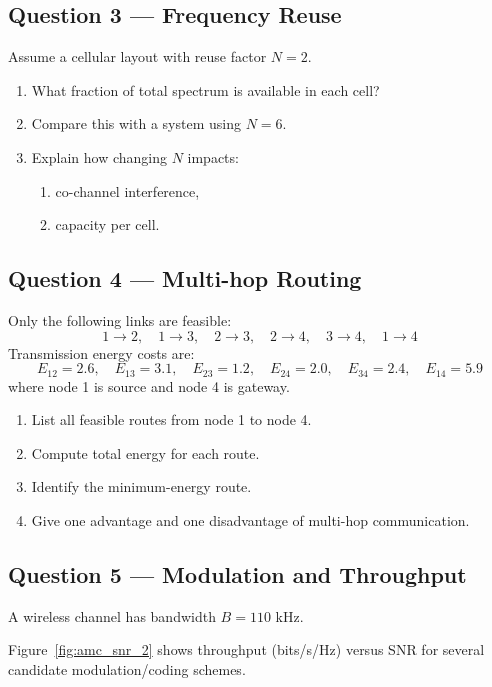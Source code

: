 \documentclass[11pt,a4paper]{article}
\begin{document}
\subsection*{Question 3 --- Frequency Reuse}
Assume a cellular layout with reuse factor $N=2$.

\begin{enumerate}[label=\alph*)]
    \item What fraction of total spectrum is available in each cell?
    \item Compare this with a system using $N=6$.
    \item Explain how changing $N$ impacts:
    \begin{enumerate}[label=\roman*)]
        \item co-channel interference,
        \item capacity per cell.
    \end{enumerate}
\end{enumerate}

\subsection*{Question 4 --- Multi-hop Routing}
Only the following links are feasible:
\[
1 \rightarrow 2,\quad 1 \rightarrow 3,\quad 2 \rightarrow 3,\quad 2 \rightarrow 4,\quad 3 \rightarrow 4,\quad 1 \rightarrow 4
\]
Transmission energy costs are:
\[
E_{12}=2.6,\quad E_{13}=3.1,\quad E_{23}=1.2,\quad E_{24}=2.0,\quad E_{34}=2.4,\quad E_{14}=5.9
\]
where node 1 is source and node 4 is gateway.

\begin{enumerate}[label=\alph*)]
    \item List all feasible routes from node 1 to node 4.
    \item Compute total energy for each route.
    \item Identify the minimum-energy route.
    \item Give one advantage and one disadvantage of multi-hop communication.
\end{enumerate}

\subsection*{Question 5 --- Modulation and Throughput}
A wireless channel has bandwidth $B = 110$ kHz.

Figure~\ref{fig:amc_snr_2} shows throughput (bits/s/Hz) versus SNR for several candidate modulation/coding schemes.

\FloatBarrier
\end{document}
